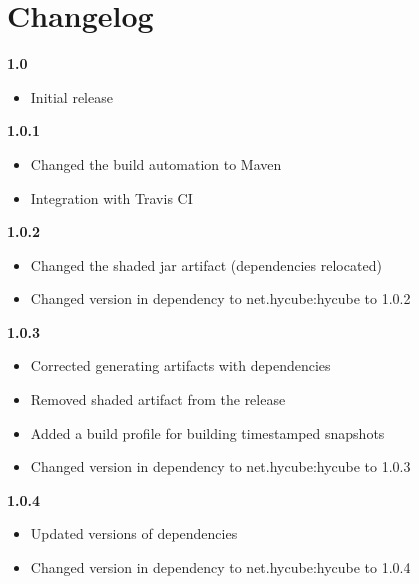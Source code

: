 \chapter{Changelog}

\noindent
\textbf{1.0}
\begin{itemize}
	\renewcommand{\labelitemi}{$\bullet$}
	\item Initial release
\end{itemize}

\noindent
\textbf{1.0.1}
\begin{itemize}
	\renewcommand{\labelitemi}{$\bullet$}
	\item Changed the build automation to Maven
	\item Integration with Travis CI
\end{itemize}

\noindent
\textbf{1.0.2}
\begin{itemize}
	\renewcommand{\labelitemi}{$\bullet$}
	\item Changed the shaded jar artifact (dependencies relocated)
	\item Changed version in dependency to net.hycube:hycube to 1.0.2
\end{itemize}

\noindent
\textbf{1.0.3}
\begin{itemize}
	\renewcommand{\labelitemi}{$\bullet$}
	\item Corrected generating artifacts with dependencies
	\item Removed shaded artifact from the release
	\item Added a build profile for building timestamped snapshots
	\item Changed version in dependency to net.hycube:hycube to 1.0.3
\end{itemize}

\noindent
\textbf{1.0.4}
\begin{itemize}
	\renewcommand{\labelitemi}{$\bullet$}
	\item Updated versions of dependencies
	\item Changed version in dependency to net.hycube:hycube to 1.0.4
\end{itemize}




